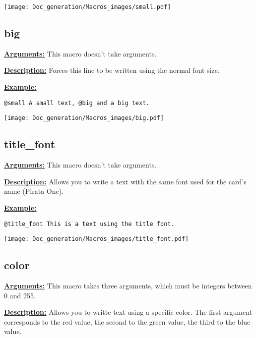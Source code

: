 \documentclass{article}
\begin{document}
\begin{center}
\texttt{[image: Doc\_generation/Macros\_images/small.pdf]}
\end{center}

\subsection{big}
\textbf{\underline{Arguments:}} This macro doesn't take arguments.

\textbf{\underline{Description:}} Forces this line to be written using the normal font size.

\textbf{\underline{Example:}}

\begin{center}
\begin{BVerbatim}
@small A small text, @big and a big text.
\end{BVerbatim}

\texttt{[image: Doc\_generation/Macros\_images/big.pdf]}
\end{center}


\subsection{title\_font}
\textbf{\underline{Arguments:}} This macro doesn't take arguments.

\textbf{\underline{Description:}} Allows you to write a text with the same font used for the card's name (Pirata One).

\textbf{\underline{Example:}}

\begin{center}
\begin{BVerbatim}
@title_font This is a text using the title font.
\end{BVerbatim}

\texttt{[image: Doc\_generation/Macros\_images/title\_font.pdf]}
\end{center}

\subsection{color}
\textbf{\underline{Arguments:}} This macro takes three arguments, which must be integers between 0 and 255.

\textbf{\underline{Description:}} Allows you to writte text using a specific color. The first argument corresponds to the red value, the second to the green value, the third to the blue value.
\end{document}
